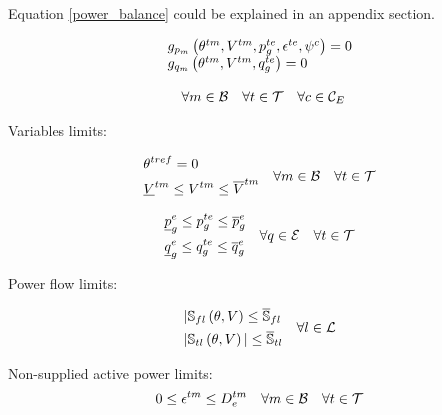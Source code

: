 Equation \ref{power_balance} could be explained in an appendix section.
 
\begin{equation}
\begin{array}{l}
g_{p_m}\left(\theta^{tm}, V^{tm}, p_{g}^{te}, \epsilon^{te}, \psi^{c}\right) = 0\\
g_{q_m}\left(\theta^{tm}, V^{tm}, q_{g}^{te}\right) = 0\\
\\
\quad \forall m \in {\cal{B}} \quad \forall t  \in {\cal{T}} \quad \forall c  \in {\cal{C}}_{E}  
\end{array}
\label{power_balance}
\end{equation}

Variables limits:

\begin{equation}
\begin{aligned}
&\theta^{tref} = 0\\
&\underline{V}^{tm} \le V^{tm}  \le \overline{V}^{tm}\\
\end{aligned} 
\quad \forall m \in {\cal{B}} \quad \forall t  \in {\cal{T}}  
\label{ang_lims}
\end{equation}

\begin{equation}
\begin{aligned}
&\underline{p}_{g}^{e} \le p_{g}^{te}  \le \overline{p}_{g}^{e}\\
&\underline{q}_{g}^{e} \le q_{g}^{te}  \le \overline{q}_{g}^{e}\\
\end{aligned} 
\quad \forall q \in {\cal{E}} \quad \forall t  \in {\cal{T}}  
\label{power_lims}
\end{equation}

Power flow limits:

\begin{equation}
\begin{aligned}
&|\mathbb{S}_{fl}\left(\theta,V\right) \le \overline{\mathbb{S}}_{fl}\\
&|\mathbb{S}_{tl}\left(\theta,V\right)| \le \overline{\mathbb{S}}_{tl}\\
\end{aligned} 
\quad \forall l \in {\cal{L}}
\label{power_lims}
\end{equation}

Non-supplied active power limits:
\begin{equation}
0 \le \epsilon^{tm} \le D^{tm}_{e} \quad \forall m \in {\cal{B}} \quad \forall t  \in {\cal{T}}  
\label{nsd_limits}
\end{equation}

